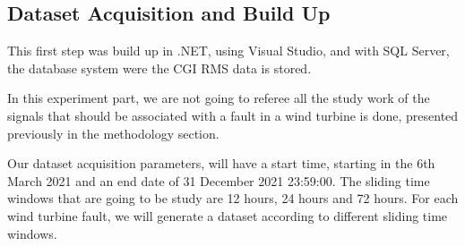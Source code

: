 \subsection{Dataset Acquisition and Build Up}
This first step was build up in .NET, using Visual Studio, and with SQL Server, the database system were the CGI RMS data is stored.

In this experiment part, we are not going to referee all the study work of the signals that should be associated with a fault in a wind turbine is done, presented previously in the methodology section.

Our dataset acquisition parameters, will have a start time, starting in the 6th March 2021 and an end date of 31 December 2021 23:59:00. The sliding time windows that are going to be study are 12 hours, 24 hours and 72 hours.
For each wind turbine fault, we will generate a dataset according to different sliding time windows.



